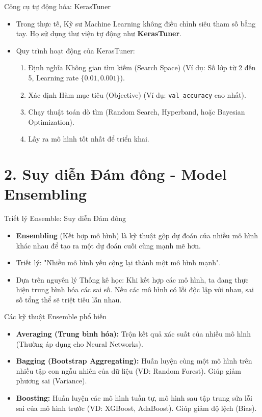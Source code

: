 \documentclass[aspectratio=169]{beamer}
\begin{document}
\begin{frame}{Công cụ tự động hóa: KerasTuner}
    \begin{itemize}
        \item Trong thực tế, Kỹ sư Machine Learning không điều chỉnh siêu tham số bằng tay. Họ sử dụng thư viện tự động như \textbf{KerasTuner}.
        \item Quy trình hoạt động của KerasTuner:
        \begin{enumerate}
            \item Định nghĩa Không gian tìm kiếm (Search Space) (Ví dụ: Số lớp từ 2 đến 5, Learning rate $\{0.01, 0.001\}$).
            \item Xác định Hàm mục tiêu (Objective) (Ví dụ: \texttt{val\_accuracy} cao nhất).
            \item Chạy thuật toán dò tìm (Random Search, Hyperband, hoặc Bayesian Optimization).
            \item Lấy ra mô hình tốt nhất để triển khai.
        \end{enumerate}
    \end{itemize}
\end{frame}

\section{2. Suy diễn Đám đông - Model Ensembling}

\begin{frame}{Triết lý Ensemble: Suy diễn Đám đông}
    \begin{itemize}
        \item \textbf{Ensembling} (Kết hợp mô hình) là kỹ thuật gộp dự đoán của nhiều mô hình khác nhau để tạo ra một dự đoán cuối cùng mạnh mẽ hơn.
        \item Triết lý: "Nhiều mô hình yếu cộng lại thành một mô hình mạnh".
        \item Dựa trên nguyên lý Thống kê học: Khi kết hợp các mô hình, ta đang thực hiện trung bình hóa các sai số. Nếu các mô hình có lỗi độc lập với nhau, sai số tổng thể sẽ triệt tiêu lẫn nhau.
    \end{itemize}
\end{frame}

\begin{frame}{Các kỹ thuật Ensemble phổ biến}
    \begin{itemize}
        \item \textbf{Averaging (Trung bình hóa):} Trộn kết quả xác suất của nhiều mô hình (Thường áp dụng cho Neural Networks).
        \item \textbf{Bagging (Bootstrap Aggregating):} Huấn luyện cùng một mô hình trên nhiều tập con ngẫu nhiên của dữ liệu (VD: Random Forest). Giúp giảm phương sai (Variance).
        \item \textbf{Boosting:} Huấn luyện các mô hình tuần tự, mô hình sau tập trung sửa lỗi sai của mô hình trước (VD: XGBoost, AdaBoost). Giúp giảm độ lệch (Bias).
    \end{itemize}
\end{frame}
\end{document}
